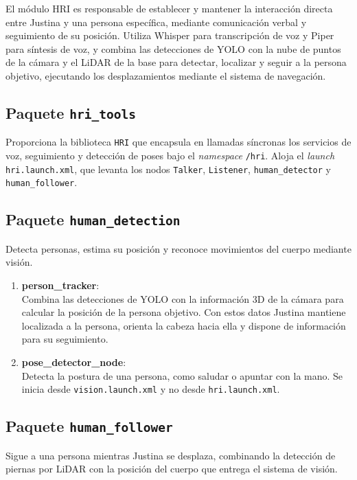 El módulo HRI es responsable de establecer y mantener la interacción directa entre Justina y una persona específica, mediante comunicación verbal y seguimiento de su posición. Utiliza Whisper para transcripción de voz y Piper para síntesis de voz, y combina las detecciones de YOLO con la nube de puntos de la cámara y el LiDAR de la base para detectar, localizar y seguir a la persona objetivo, ejecutando los desplazamientos mediante el sistema de navegación.

\subsection{Paquete \texttt{hri\_tools}}
Proporciona la biblioteca \texttt{HRI} que encapsula en llamadas síncronas los servicios de voz, seguimiento y detección de poses bajo el \textit{namespace} \texttt{/hri}. Aloja el \textit{launch} \texttt{hri.launch.xml}, que levanta los nodos \texttt{Talker}, \texttt{Listener}, \texttt{human\_detector} y \texttt{human\_follower}.

\subsection{Paquete \texttt{human\_detection}}
Detecta personas, estima su posición y reconoce movimientos del cuerpo mediante visión.

\begin{enumerate}
    \item \textbf{person\_tracker}: \\
    Combina las detecciones de YOLO con la información 3D de la cámara para calcular la posición de la persona objetivo. Con estos datos Justina mantiene localizada a la persona, orienta la cabeza hacia ella y dispone de información para su seguimiento.

    \item \textbf{pose\_detector\_node}: \\
    Detecta la postura de una persona, como saludar o apuntar con la mano. Se inicia desde \texttt{vision.launch.xml} y no desde \texttt{hri.launch.xml}.
\end{enumerate}

\subsection{Paquete \texttt{human\_follower}}
Sigue a una persona mientras Justina se desplaza, combinando la detección de piernas por LiDAR con la posición del cuerpo que entrega el sistema de visión.

